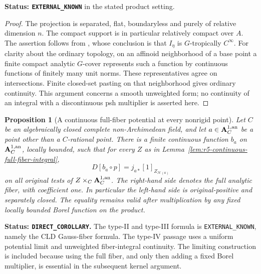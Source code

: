 \documentclass[11pt,a4paper]{article}
\numberwithin{equation}{section}
\newtheorem{proposition}[theorem]{Proposition}
\theoremstyle{definition}
\theoremstyle{remark}
\begin{document}
\noindent\textbf{Status: \texttt{EXTERNAL\_KNOWN}} in the stated
product setting.

\begin{proof}
The projection is separated, flat, boundaryless and purely of
relative dimension $n$.  The compact support is in particular
relatively compact over $A$.  The assertion follows from
\cite[Theorem 16.3.3(d), pp.~447--450]{CLD25}, whose conclusion is
that $I_\eta$ is $G$-tropically $C^\infty$.
For clarity about the ordinary topology, on an affinoid neighborhood
of a base point a finite compact analytic $G$-cover represents such
a function by continuous functions of finitely many unit norms.
These representatives agree on intersections.  Finite closed-set
pasting on that neighborhood gives ordinary continuity.  This
argument concerns a smooth unweighted form; no continuity of an
integral with a discontinuous psh multiplier is asserted here.
\end{proof}

\begin{proposition}[A continuous full-fiber potential at every nonrigid point]
\label{prop:r5-type-four-full-fiber-potential}
Let $C$ be an algebraically closed complete non-Archimedean field,
and let $a\in\mathbf A_C^{1,\rm an}$ be a point other than a
$C$-rational point.  There is a finite continuous function $b_a$ on
$\mathbf A_C^{1,\rm an}$, locally bounded, such that for every $Z$
as in Lemma~\ref{lem:r5-continuous-full-fiber-integral},
\begin{equation}\label{eq:r5-all-nonrigid-full-fiber}
 D[b_a\circ p]=j_{a*}[1]_{Z_{\mathscr H(a)}}
\end{equation}
on all original tests of $Z\times_C\mathbf A_C^{1,\rm an}$.
The right-hand side denotes the full analytic fiber, with coefficient
one.  In particular the left-hand side is original-positive and
separately closed.  The equality remains valid after multiplication
by any fixed locally bounded Borel function on the product.
\end{proposition}

\noindent\textbf{Status: \texttt{DIRECT\_COROLLARY}.}
The type-II and type-III formula is \texttt{EXTERNAL\_KNOWN},
namely the CLD Gauss-fiber formula. The type-IV passage uses a
uniform potential limit and unweighted fiber-integral continuity.
The limiting construction is included
because using the full fiber, and only then adding a fixed Borel
multiplier, is essential in the subsequent kernel argument.
\end{document}
